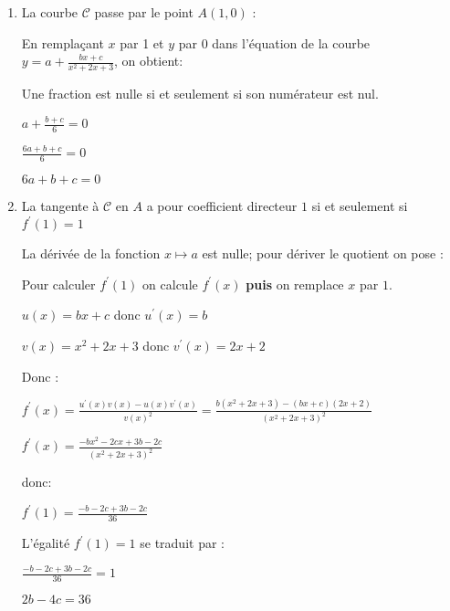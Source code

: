 \begin{corrige}
     \begin{enumerate}
          \item
          La courbe $\mathscr C$ passe par le point $A\left(1,0\right)$ :
          \par
          En remplaçant $x$ par 1 et $y$ par 0 dans l'équation de la courbe $y=a+ \frac{bx+c}{x^{2}+2x+3}$, on obtient:
          \begin{note}Une fraction est nulle si et seulement si son numérateur est nul.
          \end{note}
          $a+\frac{b+c}{6}=0$
          \par
          $\frac{6a+b+c}{6}=0$
          \par
          $6a+b+c=0$
          \item
          La tangente à $\mathscr C$ en $A$ a pour coefficient directeur $1$ si et seulement si $f^{\prime}\left(1\right)=1$
          \par
          La dérivée de la fonction $x\mapsto a$ est nulle; pour dériver le quotient on pose :
          \begin{note}Pour calculer $f^{\prime}\left(1\right)$ on calcule $f^{\prime}\left(x\right)$ \textbf{puis} on remplace $x$ par $1$.
          \end{note}
          $u\left(x\right)=bx+c$   donc $u^{\prime}\left(x\right)=b$
          \par
          $v\left(x\right)=x^{2}+2x+3$   donc $v^{\prime}\left(x\right)=2x+2$
          \par
          Donc :
          \par
          $f^{\prime}\left(x\right)=\frac{u^{\prime}\left(x\right)v\left(x\right)-u\left(x\right)v^{\prime}\left(x\right)}{v\left(x\right)^{2}}=\frac{b\left(x^{2}+2x+3\right)-\left(bx+c\right)\left(2x+2\right)}{\left(x^{2}+2x+3\right)^{2}}$
          \par
          $f^{\prime}\left(x\right)=\frac{-bx^{2}-2cx+3b-2c}{\left(x^{2}+2x+3\right)^{2}}$
          \par
          donc:
          \par
          $f^{\prime}\left(1\right)=\frac{-b-2c+3b-2c}{36}$
          \par
          L'égalité $f^{\prime}\left(1\right)=1$ se traduit par :
          \par
          $\frac{-b-2c+3b-2c}{36}=1$
          \par
          $2b-4c=36$
          \par

\end{enumerate}
\end{corrige}
